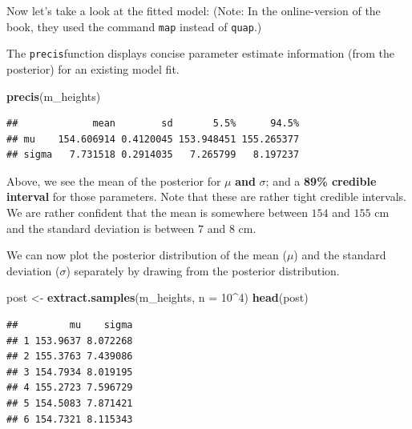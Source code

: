 \documentclass[
]{book}
\newenvironment{Shaded}{\begin{snugshade}}{\end{snugshade}}
\newcommand{\AttributeTok}[1]{\textcolor[rgb]{0.13,0.29,0.53}{#1}}
\newcommand{\DecValTok}[1]{\textcolor[rgb]{0.00,0.00,0.81}{#1}}
\newcommand{\FunctionTok}[1]{\textcolor[rgb]{0.13,0.29,0.53}{\textbf{#1}}}
\newcommand{\NormalTok}[1]{#1}
\newcommand{\OtherTok}[1]{\textcolor[rgb]{0.56,0.35,0.01}{#1}}
\newcommand{\SpecialCharTok}[1]{\textcolor[rgb]{0.81,0.36,0.00}{\textbf{#1}}}
\begin{document}
Now let's take a look at the fitted model:
(Note: In the online-version of the book, they used the command \texttt{map} instead of \texttt{quap}.)

The \texttt{precis}function displays concise parameter estimate information
(from the posterior) for an existing model fit.

\begin{Shaded}
\begin{Highlighting}[]
\FunctionTok{precis}\NormalTok{(m\_heights)}
\end{Highlighting}
\end{Shaded}

\begin{verbatim}
##             mean        sd       5.5%      94.5%
## mu    154.606914 0.4120045 153.948451 155.265377
## sigma   7.731518 0.2914035   7.265799   8.197237
\end{verbatim}

Above, we see the mean of the posterior for \(\mu\) \textbf{and} \(\sigma\);
and a \textbf{89\% credible interval} for those parameters.
Note that these are rather tight credible intervals. We are rather confident that the mean is somewhere between
\(154\) and \(155\) cm and the standard deviation is between \(7\) and \(8\) cm.

We can now plot the posterior distribution of the mean (\(\mu\)) and the standard
deviation (\(\sigma\)) separately by drawing from the posterior distribution.

\begin{Shaded}
\begin{Highlighting}[]
\NormalTok{post }\OtherTok{\textless{}{-}} \FunctionTok{extract.samples}\NormalTok{(m\_heights, }\AttributeTok{n =} \DecValTok{10}\SpecialCharTok{\^{}}\DecValTok{4}\NormalTok{)}
\FunctionTok{head}\NormalTok{(post)}
\end{Highlighting}
\end{Shaded}

\begin{verbatim}
##         mu    sigma
## 1 153.9637 8.072268
## 2 155.3763 7.439086
## 3 154.7934 8.019195
## 4 155.2723 7.596729
## 5 154.5083 7.871421
## 6 154.7321 8.115343
\end{verbatim}

\begin{Shaded}
\end{Shaded}
\end{document}
